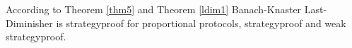\begin{bezeichnungen}
According to Theorem \ref{thm5} and Theorem \ref{ldim1}%
Banach-Knaster Last-Diminisher is strategyproof for proportional protocols, strategyproof%
 and weak strategyproof.
\end{bezeichnungen}

\newpage
